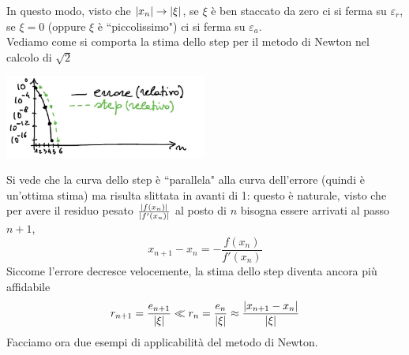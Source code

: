 In questo modo, visto che $\lvert x_n\rvert \to \lvert\xi\rvert$, se $\xi$ è  ben staccato da zero ci si ferma su $\varepsilon_r$, se $\xi = 0$ (oppure $\xi$ è ``piccolissimo") ci si ferma su $\varepsilon_a$.\\
Vediamo come si comporta la stima dello step per il metodo di Newton nel calcolo di $\sqrt{2}$
\begin{center}
\includegraphics[width=0.5\textwidth]{foto/pag27.JPG}
\end{center}
Si vede che la curva dello step è ``parallela" alla curva dell'errore (quindi è un'ottima stima) ma risulta slittata in avanti di 1: questo è naturale, visto che per avere il residuo pesato $\frac{\lvert f(x_n)\rvert}{\lvert f'(x_n)\rvert}$ al posto di $n$ bisogna essere arrivati al passo $n+1$, 
\[x_{n+1} - x_n = - \frac{f(x_n)}{f'(x_n)}\]
Siccome l'errore decresce velocemente, la stima dello step diventa ancora più affidabile
\[ r_{n+1} = \frac{e_{n+1}}{\lvert\xi\rvert} \ll r_n = \frac{e_n}{\lvert\xi\rvert} \approx \frac{\lvert x_{n+1} - x_n\rvert}{\lvert\xi\rvert}\]
Facciamo ora due esempi di applicabilità del metodo di Newton.

